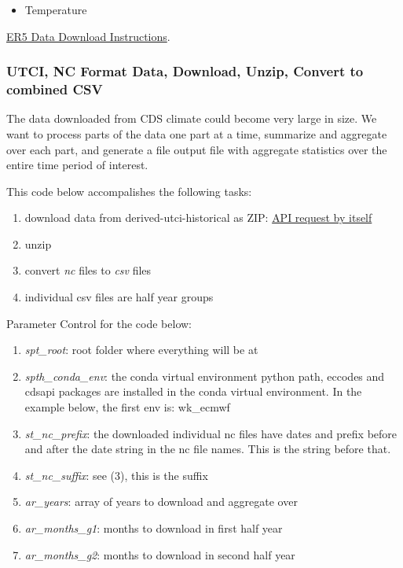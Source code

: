 \documentclass[
]{book}
\providecommand{\tightlist}{%
  \setlength{\itemsep}{0pt}\setlength{\parskip}{0pt}}
\begin{document}
\begin{itemize}
\tightlist
\item
  Temperature
\end{itemize}

\href{https://confluence.ecmwf.int/display/CKB/How+to+download+ERA5}{ER5 Data Download Instructions}.

\hypertarget{utci-nc-format-data-download-unzip-convert-to-combined-csv}{%
\subsubsection{UTCI, NC Format Data, Download, Unzip, Convert to combined CSV}\label{utci-nc-format-data-download-unzip-convert-to-combined-csv}}

The data downloaded from CDS climate could become very large in size. We want to process parts of the data one part at a time, summarize and aggregate over each part, and generate a file output file with aggregate statistics over the entire time period of interest.

This code below accompalishes the following tasks:

\begin{enumerate}
\def\labelenumi{\arabic{enumi}.}
\tightlist
\item
  download data from derived-utci-historical as ZIP: \href{../ecmwf_scripts/ecmef_pressure_utci_historical.py}{API request by itself}
\item
  unzip
\item
  convert \emph{nc} files to \emph{csv} files
\item
  individual csv files are half year groups
\end{enumerate}

Parameter Control for the code below:

\begin{enumerate}
\def\labelenumi{\arabic{enumi}.}
\tightlist
\item
  \emph{spt\_root}: root folder where everything will be at
\item
  \emph{spth\_conda\_env}: the conda virtual environment python path, eccodes and cdsapi packages are installed in the conda virtual environment. In the example below, the first env is: wk\_ecmwf
\item
  \emph{st\_nc\_prefix}: the downloaded individual nc files have dates and prefix before and after the date string in the nc file names. This is the string before that.
\item
  \emph{st\_nc\_suffix}: see (3), this is the suffix
\item
  \emph{ar\_years}: array of years to download and aggregate over
\item
  \emph{ar\_months\_g1}: months to download in first half year
\item
  \emph{ar\_months\_g2}: months to download in second half year
\end{enumerate}
\end{document}
